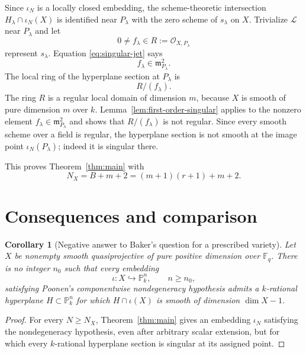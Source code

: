 \documentclass{lms}
\newtheorem{corollary}[theorem]{Corollary}
\newcommand{\F}{\mathbb F}
\newcommand{\PP}{\mathbb P}
\newcommand{\OO}{\mathcal O}
\newcommand{\LL}{\mathcal L}
\newcommand{\mm}{\mathfrak m}
\begin{document}
Since $\iota_N$ is a locally closed embedding, the scheme-theoretic intersection $H_\lambda\cap\iota_N(X)$ is identified near $P_\lambda$ with the zero scheme of $s_\lambda$ on $X$.  Trivialize $\LL$ near $P_\lambda$ and let
\[
        0\ne f_\lambda\in R:=\OO_{X,P_\lambda}
\]
represent $s_\lambda$.  Equation \eqref{eq:singular-jet} says
\[
        f_\lambda\in\mm_{P_\lambda}^2.
\]
The local ring of the hyperplane section at $P_\lambda$ is
\[
        R/(f_\lambda).
\]
The ring $R$ is a regular local domain of dimension $m$, because $X$ is smooth of pure dimension $m$ over $k$.  Lemma~\ref{lem:first-order-singular} applies to the nonzero element $f_\lambda\in\mm_{P_\lambda}^2$ and shows that $R/(f_\lambda)$ is not regular.  Since every smooth scheme over a field is regular, the hyperplane section is not smooth at the image point $\iota_N(P_\lambda)$; indeed it is singular there.

This proves Theorem~\ref{thm:main} with
\[
        N_X=B+m+2=(m+1)(r+1)+m+2.
\]


\section{Consequences and comparison}\label{sec:comparison}

\begin{corollary}[Negative answer to Baker's question for a prescribed variety]\label{cor:poonen}
Let $X$ be nonempty smooth quasiprojective of pure positive dimension over $\F_q$.  There is no integer $n_0$ such that every embedding
\[
        \iota:X\hookrightarrow\PP^n_k,
        \qquad n\ge n_0,
\]
satisfying Poonen's componentwise nondegeneracy hypothesis admits a $k$-rational hyperplane $H\subset\PP^n_k$ for which $H\cap\iota(X)$ is smooth of dimension $\dim X-1$.
\end{corollary}

\begin{proof}
For every $N\ge N_X$, Theorem~\ref{thm:main} gives an embedding $\iota_N$ satisfying the nondegeneracy hypothesis, even after arbitrary scalar extension, but for which every $k$-rational hyperplane section is singular at its assigned point.
\end{proof}
\end{document}
